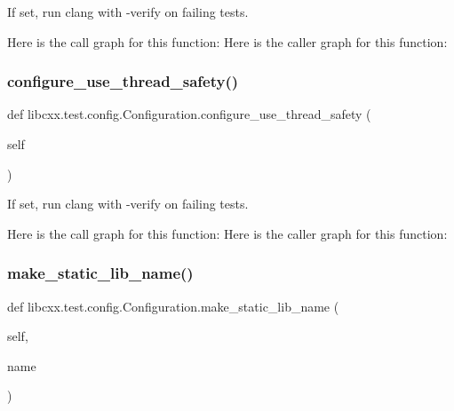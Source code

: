 \begin{DoxyVerb}If set, run clang with -verify on failing tests.\end{DoxyVerb}
 Here is the call graph for this function\+:
Here is the caller graph for this function\+:
\mbox{\label{classlibcxx_1_1test_1_1config_1_1_configuration_a2b88b4f3a6876f07f2d3098fa2991716}} 
\subsubsection{\texorpdfstring{configure\+\_\+use\+\_\+thread\+\_\+safety()}{configure\_use\_thread\_safety()}}
{\footnotesize\ttfamily def libcxx.\+test.\+config.\+Configuration.\+configure\+\_\+use\+\_\+thread\+\_\+safety (\begin{DoxyParamCaption}\item[{}]{self }\end{DoxyParamCaption})}

\begin{DoxyVerb}If set, run clang with -verify on failing tests.\end{DoxyVerb}
 Here is the call graph for this function\+:
Here is the caller graph for this function\+:
\mbox{\label{classlibcxx_1_1test_1_1config_1_1_configuration_abc51eef879457ae51d3f235627bc4099}} 
\subsubsection{\texorpdfstring{make\+\_\+static\+\_\+lib\+\_\+name()}{make\_static\_lib\_name()}}
{\footnotesize\ttfamily def libcxx.\+test.\+config.\+Configuration.\+make\+\_\+static\+\_\+lib\+\_\+name (\begin{DoxyParamCaption}\item[{}]{self,  }\item[{}]{name }\end{DoxyParamCaption})}


